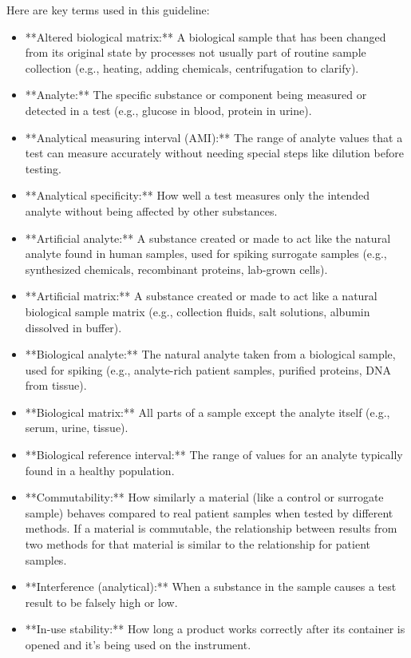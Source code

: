 \documentclass{article}
\begin{document}
Here are key terms used in this guideline:
\begin{itemize}
    \item **Altered biological matrix:** A biological sample that has been changed from its original state by processes not usually part of routine sample collection (e.g., heating, adding chemicals, centrifugation to clarify).
    \item **Analyte:** The specific substance or component being measured or detected in a test (e.g., glucose in blood, protein in urine).
    \item **Analytical measuring interval (AMI):** The range of analyte values that a test can measure accurately without needing special steps like dilution before testing.
    \item **Analytical specificity:** How well a test measures only the intended analyte without being affected by other substances.
    \item **Artificial analyte:** A substance created or made to act like the natural analyte found in human samples, used for spiking surrogate samples (e.g., synthesized chemicals, recombinant proteins, lab-grown cells).
    \item **Artificial matrix:** A substance created or made to act like a natural biological sample matrix (e.g., collection fluids, salt solutions, albumin dissolved in buffer).
    \item **Biological analyte:** The natural analyte taken from a biological sample, used for spiking (e.g., analyte-rich patient samples, purified proteins, DNA from tissue).
    \item **Biological matrix:** All parts of a sample except the analyte itself (e.g., serum, urine, tissue).
    \item **Biological reference interval:** The range of values for an analyte typically found in a healthy population.
    \item **Commutability:** How similarly a material (like a control or surrogate sample) behaves compared to real patient samples when tested by different methods. If a material is commutable, the relationship between results from two methods for that material is similar to the relationship for patient samples.
    \item **Interference (analytical):** When a substance in the sample causes a test result to be falsely high or low.
    \item **In-use stability:** How long a product works correctly after its container is opened and it's being used on the instrument.

\end{itemize}
\end{document}
